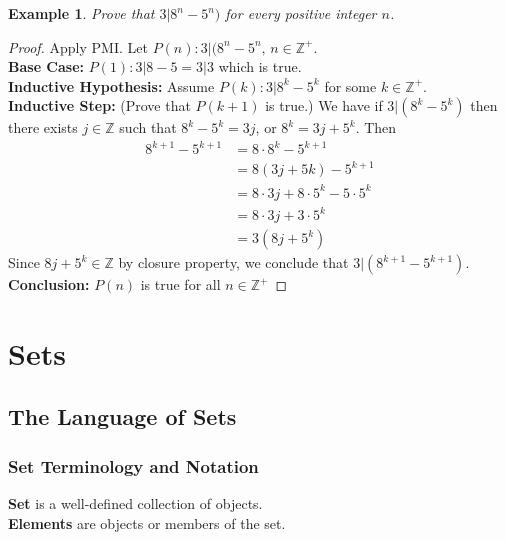 \documentclass[10pt,reqno]{book}
\theoremstyle{plain}
\newtheorem{example}{Example}
\def\Z{\mathbb{Z}}
\begin{document}
	\begin{example}
		Prove that $ 3|8^n-5^n) $ for every positive integer $ n $.
	\end{example}

	\begin{proof}
		Apply PMI. Let $ P(n): 3|(8^n-5^n, \, n \in \Z^+ $.\\
		
		\noindent \textbf{Base Case:} $ P(1): 3|8-5 = 3|3 $ which is true.\\
		
		\noindent \textbf{Inductive Hypothesis:} Assume $ P(k): 3|8^k-5^k $ for some $ k \in \Z^+ $.\\
		
		\noindent \textbf{Inductive Step:} (Prove that $ P(k+1) $ is true.) We have if $ 3|(8^k-5^k) $ then there exists $ j \in \Z $ such that $ 8^k-5^k=3j $, or $ 8^k = 3j + 5^k $. Then
			\begin{align*}
				8^{k+1} - 5^{k+1} &= 8 \cdot 8^k - 5^{k+1}\\
				&= 8(3j + 5k) - 5^{k+1}\\
				&= 8 \cdot 3j + 8 \cdot 5^k - 5 \cdot 5^k\\
				&= 8 \cdot 3j + 3 \cdot 5^k\\
				&= 3(8j+ 5^k)
			\end{align*}
		Since $ 8j + 5^k \in \Z $ by closure property, we conclude that $ 3|(8^{k+1} - 5^{k+1}) $.\\
		
		\noindent \textbf{Conclusion:} $ P(n) $ is true for all $ n \in \Z^+ $
	\end{proof}
	
	
	
	
	\chapter{Sets}
	
	\section{The Language of Sets}
	
	\subsection*{Set Terminology and Notation}
	
	\textbf{Set} is a well-defined collection of objects.\\
	\noindent \textbf{Elements} are objects or members of the set.
	
\end{document}
